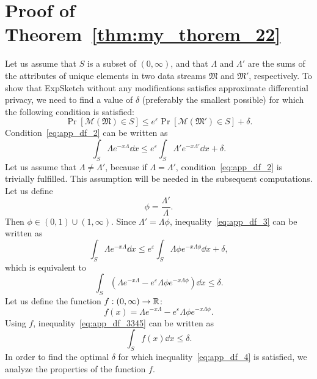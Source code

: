 \chapter{Proof of Theorem~\ref{thm:my_thorem_22}}
\label{appendix:my_theorem_1}

Let us assume that $S$ is a subset of $(0, \infty)$, and that $\Lambda$ and $\Lambda'$ are the sums of the attributes of unique elements in two data streams $\mathfrak{M}$ and $\mathfrak{M}'$, respectively. To show that ExpSketch without any modifications satisfies approximate differential privacy, we need to find a value of $\delta$ (preferably the smallest possible) for which the following condition is satisfied:
\begin{equation}
\Pr[\mathcal{M}(\mathfrak{M}) \in S] \leq e^{\varepsilon} \Pr[\mathcal{M}(\mathfrak{M}') \in S] + \delta.
\label{eq:app_df_2}
\end{equation}
Condition~\eqref{eq:app_df_2} can be written as
\begin{equation}
\int_{S} \Lambda e^{-x\Lambda} \dd x \leq e^{\varepsilon} \int_{S} \Lambda' e^{-x\Lambda'} \dd x + \delta.
\label{eq:app_df_3}
\end{equation}
Let us assume that $\Lambda \neq \Lambda'$, because if $\Lambda = \Lambda'$, condition~\eqref{eq:app_df_2} is trivially fulfilled. This assumption will be needed in the subsequent computations. Let us define
\[
\phi = \frac{\Lambda'}{\Lambda}.
\]
Then $\phi \in (0, 1) \cup (1, \infty)$. Since $\Lambda' = \Lambda\phi$, inequality~\eqref{eq:app_df_3} can be written as
\[
\int_{S} \Lambda e^{-x\Lambda} \dd x \leq e^{\varepsilon} \int_{S} \Lambda\phi e^{-x\Lambda\phi} \dd x + \delta,
\]
which is equivalent to
\begin{equation}
\int_{S} \left(\Lambda e^{-x\Lambda} - e^{\varepsilon}\Lambda\phi e^{-x\Lambda\phi} \right) \dd x \leq \delta.
\label{eq:app_df_3345}
\end{equation}
Let us define the function $f : (0, \infty) \rightarrow \mathbb{R}$:
\[
f(x) = \Lambda e^{-x\Lambda} - e^{\varepsilon}\Lambda\phi e^{-x\Lambda\phi}.
\]
Using $f$, inequality~\eqref{eq:app_df_3345} can be written as
\begin{equation}
\int_S f(x) \dd x \leq \delta.
\label{eq:app_df_4}
\end{equation}
In order to find the optimal $\delta$ for which inequality~\eqref{eq:app_df_4} is satisfied, we analyze the properties of the function $f$.
